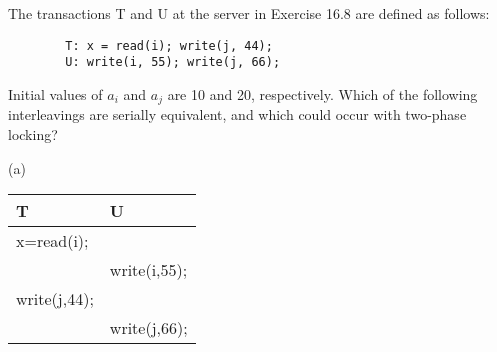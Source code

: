 \documentclass{article}
\begin{document}
\begin{tcolorbox}[colback=blue!5!white,colframe=blue!75!black,title=Problem 16.9]
    The transactions T and U at the server in Exercise 16.8 are defined as follows:
    \begin{verbatim}
        T: x = read(i); write(j, 44);
        U: write(i, 55); write(j, 66);
    \end{verbatim}
    Initial values of $a_i$ and $a_j$ are 10 and 20, respectively. Which of the following
    interleavings are serially equivalent, and which could occur with two-phase locking?
    \begin{multicols}{2}
        \begin{enumerate}(a)
        \begin{table}[H]
        \begin{tabular}{ll}
                    T                              & U                                \\ \hline
            \multicolumn{1}{l}{x=read(i);} & \multicolumn{1}{l}{}             \\
            \multicolumn{1}{l}{}           & \multicolumn{1}{l}{write(i,55);} \\
            write(j,44);                   &                                  \\
                                           & write(j,66);    
        \end{tabular}
        \end{table}


\end{enumerate}
\end{multicols}
\end{tcolorbox}
\end{document}

